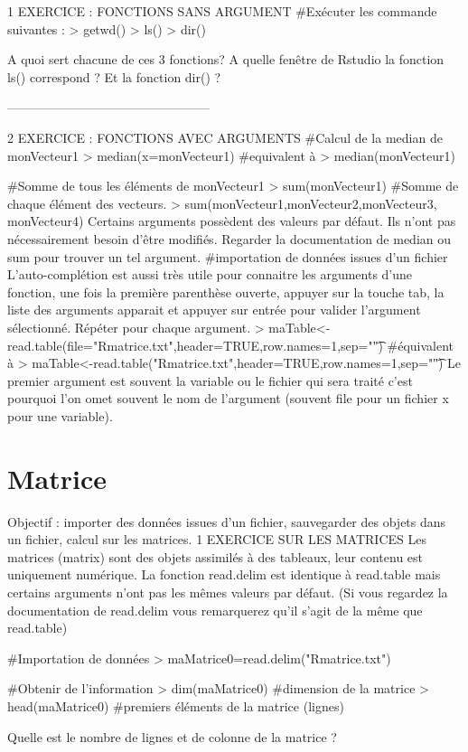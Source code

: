 \documentclass[a4paper]{article}
\begin{document}
1	EXERCICE : FONCTIONS SANS ARGUMENT 
\#Exécuter les commande suivantes :
> getwd() 	
> ls() 	
> dir() 	

A quoi sert chacune de ces 3 fonctions? A quelle fenêtre de Rstudio la fonction ls() correspond ? Et la fonction dir() ?


------------------------------------------------

2	EXERCICE : FONCTIONS AVEC ARGUMENTS
\#Calcul de la median de monVecteur1
> median(x=monVecteur1)
\#equivalent à
> median(monVecteur1)

\#Somme de tous les éléments de monVecteur1
> sum(monVecteur1)
\#Somme de chaque élément des vecteurs.
> sum(monVecteur1,monVecteur2,monVecteur3, monVecteur4)
Certains arguments possèdent des valeurs par défaut. Ils n'ont pas nécessairement besoin d'être modifiés.
Regarder la documentation de median ou sum pour trouver un tel argument.
\#importation de données issues d'un fichier
L'auto-complétion est aussi très utile pour connaitre les arguments d'une fonction, une fois la première parenthèse ouverte,  appuyer sur la touche tab, la liste des arguments apparait et appuyer sur entrée pour valider l'argument sélectionné. Répéter pour chaque argument.
> maTable<-read.table(file="Rmatrice.txt",header=TRUE,row.names=1,sep="\t")
\#équivalent à 
> maTable<-read.table("Rmatrice.txt",header=TRUE,row.names=1,sep="\t")
Le premier argument est souvent la variable ou le fichier qui sera traité c'est pourquoi l'on omet souvent le nom de l'argument (souvent file pour un fichier x pour une variable).
\section{Matrice}
Objectif : importer des données issues d'un fichier, sauvegarder des objets dans un fichier, calcul sur les matrices.
1	EXERCICE SUR LES MATRICES
Les matrices (matrix) sont des objets assimilés à des tableaux, leur contenu est uniquement numérique.
La fonction read.delim est identique à read.table mais certains arguments n'ont pas les mêmes valeurs par défaut. (Si vous regardez la documentation de read.delim vous remarquerez qu'il s'agit de la même que read.table)

\#Importation de données
> maMatrice0=read.delim("Rmatrice.txt")

\#Obtenir de l'information
> dim(maMatrice0) \#dimension de la matrice
> head(maMatrice0) \#premiers éléments de la matrice (lignes)

Quelle est le nombre de lignes et de colonne de la matrice ?
\end{document}
